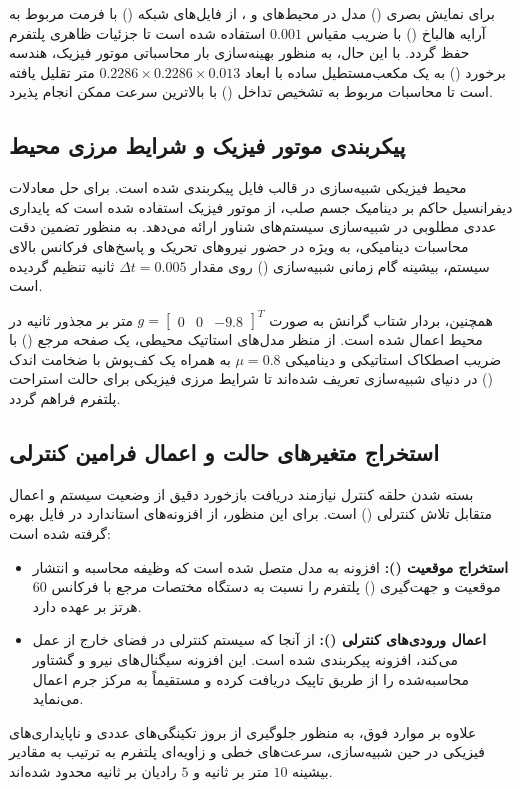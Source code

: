 	برای نمایش بصری () مدل در محیط‌های  و ، از فایل‌های شبکه () با فرمت  مربوط به آرایه هالباخ () با ضریب مقیاس $0.001$ استفاده شده است تا جزئیات ظاهری پلتفرم حفظ گردد. با این حال، به منظور بهینه‌سازی بار محاسباتی موتور فیزیک، هندسه برخورد () به یک مکعب‌مستطیل ساده با ابعاد $0.2286 \times 0.2286 \times 0.013$ متر تقلیل یافته است تا محاسبات مربوط به تشخیص تداخل () با بالاترین سرعت ممکن انجام پذیرد.
	
	\subsection{پیکربندی موتور فیزیک و شرایط مرزی محیط}
	\label{subsec:method-physics-config}
	محیط فیزیکی شبیه‌سازی در قالب فایل  پیکربندی شده است. برای حل معادلات دیفرانسیل حاکم بر دینامیک جسم صلب، از موتور فیزیک  استفاده شده است که پایداری عددی مطلوبی در شبیه‌سازی سیستم‌های شناور ارائه می‌دهد. به منظور تضمین دقت محاسبات دینامیکی، به ویژه در حضور نیروهای تحریک و پاسخ‌های فرکانس بالای سیستم، بیشینه گام زمانی شبیه‌سازی () روی مقدار $\Delta t = 0.005$ ثانیه تنظیم گردیده است. 
	
	همچنین، بردار شتاب گرانش به صورت $g = \begin{bmatrix} 0 & 0 & -9.8 \end{bmatrix}^T$ متر بر مجذور ثانیه در محیط اعمال شده است. از منظر مدل‌های استاتیک محیطی، یک صفحه مرجع () با ضریب اصطکاک استاتیکی و دینامیکی $\mu = 0.8$ به همراه یک کف‌پوش با ضخامت اندک () در دنیای شبیه‌سازی تعریف شده‌اند تا شرایط مرزی فیزیکی برای حالت استراحت پلتفرم فراهم گردد.
	
	\subsection{استخراج متغیرهای حالت و اعمال فرامین کنترلی}
	\label{subsec:method-state-feedback}
	بسته شدن حلقه کنترل نیازمند دریافت بازخورد دقیق از وضعیت سیستم و اعمال متقابل تلاش کنترلی () است. برای این منظور، از افزونه‌های استاندارد  در فایل  بهره گرفته شده است:
	\begin{itemize}
		\item \textbf{استخراج موقعیت ():} افزونه  به مدل متصل شده است که وظیفه محاسبه و انتشار موقعیت و جهت‌گیری () پلتفرم را نسبت به دستگاه مختصات مرجع با فرکانس $60$ هرتز بر عهده دارد.
		\item \textbf{اعمال ورودی‌های کنترلی ():} از آنجا که سیستم کنترلی در فضای خارج از  عمل می‌کند، افزونه  پیکربندی شده است. این افزونه سیگنال‌های نیرو و گشتاور محاسبه‌شده را از طریق تاپیک  دریافت کرده و مستقیماً به مرکز جرم  اعمال می‌نماید.
	\end{itemize}
	علاوه بر موارد فوق، به منظور جلوگیری از بروز تکینگی‌های عددی و ناپایداری‌های فیزیکی در حین شبیه‌سازی، سرعت‌های خطی و زاویه‌ای پلتفرم به ترتیب به مقادیر بیشینه $10$ متر بر ثانیه و $5$ رادیان بر ثانیه محدود شده‌اند.
	
